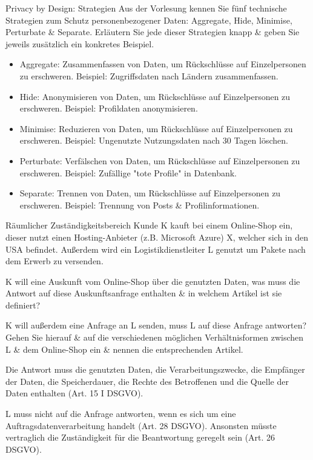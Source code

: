 \documentclass{article}
\begin{document}
\begin{exercise}{Privacy by Design: Strategien}
  Aus der Vorlesung kennen Sie fünf technische Strategien zum Schutz personenbezogener Daten: Aggregate, Hide, Minimise, Perturbate \& Separate.
  Erläutern Sie jede dieser Strategien knapp \& geben Sie jeweils zusätzlich ein konkretes Beispiel.
\end{exercise}

\begin{solution}
  \begin{itemize}
    \item Aggregate: Zusammenfassen von Daten, um Rückschlüsse auf Einzelpersonen zu erschweren. Beispiel: Zugriffsdaten nach Ländern zusammenfassen.
    \item Hide: Anonymisieren von Daten, um Rückschlüsse auf Einzelpersonen zu erschweren. Beispiel: Profildaten anonymisieren.
    \item Minimise: Reduzieren von Daten, um Rückschlüsse auf Einzelpersonen zu erschweren. Beispiel: Ungenutzte Nutzungsdaten nach 30 Tagen löschen.
    \item Perturbate: Verfälschen von Daten, um Rückschlüsse auf Einzelpersonen zu erschweren. Beispiel: Zufällige "tote Profile" in Datenbank.
    \item Separate: Trennen von Daten, um Rückschlüsse auf Einzelpersonen zu erschweren. Beispiel: Trennung von Posts \& Profilinformationen.
  \end{itemize}
\end{solution}

\begin{eexercises}{Räumlicher Zuständigkeitsbereich}{
    Kunde K kauft bei einem Online-Shop ein, dieser nutzt einen Hosting-Anbieter (z.B. Microsoft Azure) X, welcher sich in den USA befindet. Außerdem wird ein Logistikdienstleiter L genutzt um Pakete nach dem Erwerb zu versenden.
  }
  \item K will eine Auskunft vom Online-Shop über die genutzten Daten, was muss die Antwort auf diese Auskunftsanfrage enthalten \& in welchem Artikel ist sie definiert?
  \item K will außerdem eine Anfrage an L senden, muss L auf diese Anfrage antworten? Gehen Sie hierauf \& auf die verschiedenen möglichen Verhältnisformen zwischen L \& dem Online-Shop ein \& nennen die entsprechenden Artikel.
\end{eexercises}

\begin{solutions}
  \item Die Antwort muss die genutzten Daten, die Verarbeitungszwecke, die Empfänger der Daten, die Speicherdauer, die Rechte des Betroffenen und die Quelle der Daten enthalten (Art. 15 I DSGVO).
  \item L muss nicht auf die Anfrage antworten, wenn es sich um eine Auftragsdatenverarbeitung handelt (Art. 28 DSGVO). Ansonsten müsste vertraglich die Zuständigkeit für die Beantwortung geregelt sein (Art. 26 DSGVO).
\end{solutions}
\end{document}
